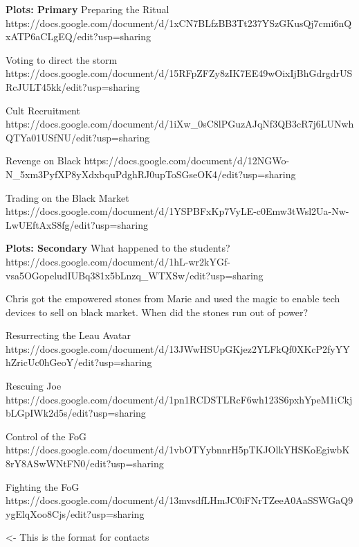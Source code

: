 \documentclass[char]{GL2020}
\begin{document}
\textbf{Plots: Primary}
Preparing the Ritual
https://docs.google.com/document/d/1xCN7BLfzBB3Tt237YSzGKusQj7cmi6nQxATP6aCLgEQ/edit?usp=sharing

Voting to direct the storm
https://docs.google.com/document/d/15RFpZFZy8zIK7EE49wOixIjBhGdrgdrUSRcJULT45kk/edit?usp=sharing

Cult Recruitment
https://docs.google.com/document/d/1iXw_0sC8lPGuzAJqNf3QB3cR7j6LUNwhQTYa01USfNU/edit?usp=sharing

Revenge on Black
https://docs.google.com/document/d/12NGWo-N_5xm3PyfXP8yXdxbquPdghRJ0upToSGseOK4/edit?usp=sharing

Trading on the Black Market
https://docs.google.com/document/d/1YSPBFxKp7VyLE-c0Emw3tWsl2Ua-Nw-LwUEftAxS8fg/edit?usp=sharing

\textbf{Plots: Secondary}
What happened to the students?
https://docs.google.com/document/d/1hL-wr2kYGf-vsa5OGopeludIUBq381x5bLnzq_WTXSw/edit?usp=sharing

Chris got the empowered stones from Marie and used the magic to enable tech devices to sell on black market.  When did the stones run out of power?

Resurrecting the Leau Avatar
https://docs.google.com/document/d/13JWwHSUpGKjez2YLFkQf0XKcP2fyYYhZricUc0hGeoY/edit?usp=sharing

Rescuing Joe
https://docs.google.com/document/d/1pn1RCDSTLRcF6wh123S6pxhYpeM1iCkjbLGpIWk2d5s/edit?usp=sharing

Control of the FoG
https://docs.google.com/document/d/1vbOTYybnnrH5pTKJOlkYHSKoEgiwbK8rY8ASwWNtFN0/edit?usp=sharing

Fighting the FoG
https://docs.google.com/document/d/13mvsdfLHmJC0iFNrTZeeA0AaSSWGaQ9ygElqXoo8Cjs/edit?usp=sharing

\begin{itemz}[Goals]
	\item 
\end{itemz}

\begin{itemz}[Notes]
	\item 
\end{itemz}

\begin{contacts}
	\contact{\cTest{}} <- This is the format for contacts 
\end{contacts}
\end{document}
